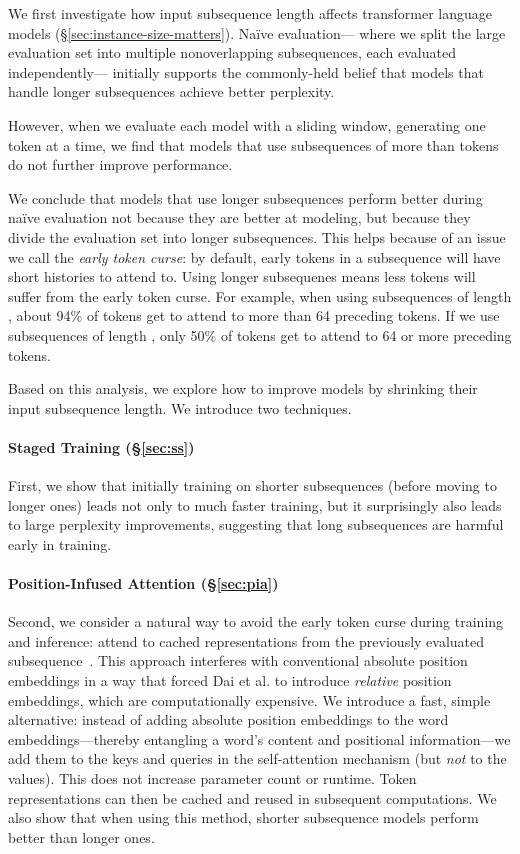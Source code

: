 \documentclass[11pt,a4paper]{article}
\begin{document}
We first investigate how input subsequence length affects transformer language models (\S\ref{sec:instance-size-matters}). 
Na\"{i}ve evaluation--- where we split the large evaluation set into multiple nonoverlapping subsequences, each evaluated independently--- initially supports the commonly-held belief that models that handle longer subsequences achieve better perplexity. 



However, when we evaluate each model with a sliding window, generating one token at a time, we find that models that use subsequences of more than  tokens do not further improve performance. 


We conclude that models that use longer subsequences  perform better during na\"{i}ve evaluation not because they are better at modeling, but because they divide the evaluation set into longer subsequences. 
This helps because of an issue we call the \emph{early token curse}: by default, early tokens in a subsequence will have short histories to attend to. 
Using longer subsequenes means less tokens will suffer from the early token curse. For example, when using subsequences of length , about 94\% of tokens get to attend to more than 64 preceding tokens. If we use subsequences of length , only 50\% of tokens get to attend to 64 or more preceding tokens. 

Based on this analysis, we explore how to improve models by shrinking their input subsequence length. We introduce two techniques. 


\paragraph{Staged Training (\S\ref{sec:ss})}

First, we show that initially training on shorter subsequences (before moving to longer ones) leads not only to much faster training, but it surprisingly also leads to large perplexity improvements, suggesting that  long subsequences are  harmful early in training. 

\paragraph{Position-Infused Attention (\S\ref{sec:pia})} 
Second,  we consider a natural way to avoid the early token curse during training and inference:   attend to cached representations from the previously evaluated subsequence~\cite{transformer-xl}. 
This approach interferes with conventional absolute position embeddings in a way that forced Dai et al. to introduce \emph{relative} position embeddings, which are computationally expensive.
We introduce a fast, simple alternative: instead of adding absolute position embeddings to the word embeddings---thereby entangling a word's content and positional information---we  add them to the keys and queries in the self-attention mechanism (but \emph{not} to the values). This does not increase parameter count or runtime. Token representations can then be cached and reused in subsequent computations. 
We also show that when using this method, shorter subsequence models perform better than longer ones. 
\end{document}
